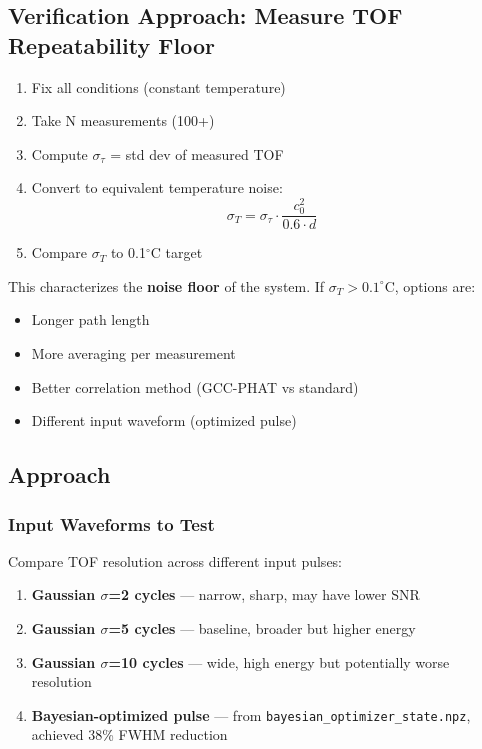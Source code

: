 \documentclass[11pt]{article}
\begin{document}
\subsection{Verification Approach: Measure TOF Repeatability Floor}

\begin{enumerate}
    \item Fix all conditions (constant temperature)
    \item Take N measurements (100+)
    \item Compute $\sigma_\tau$ = std dev of measured TOF
    \item Convert to equivalent temperature noise:
    $$\sigma_T = \sigma_\tau \cdot \frac{c_0^2}{0.6 \cdot d}$$
    \item Compare $\sigma_T$ to 0.1$^\circ$C target
\end{enumerate}

This characterizes the \textbf{noise floor} of the system. If $\sigma_T > 0.1^\circ$C, options are:
\begin{itemize}
    \item Longer path length
    \item More averaging per measurement
    \item Better correlation method (GCC-PHAT vs standard)
    \item Different input waveform (optimized pulse)
\end{itemize}

\subsection{Approach}

\subsubsection{Input Waveforms to Test}

Compare TOF resolution across different input pulses:

\begin{enumerate}
    \item \textbf{Gaussian $\sigma$=2 cycles} --- narrow, sharp, may have lower SNR
    \item \textbf{Gaussian $\sigma$=5 cycles} --- baseline, broader but higher energy
    \item \textbf{Gaussian $\sigma$=10 cycles} --- wide, high energy but potentially worse resolution
    \item \textbf{Bayesian-optimized pulse} --- from \texttt{bayesian\_optimizer\_state.npz}, achieved 38\% FWHM reduction
\end{enumerate}
\end{document}

